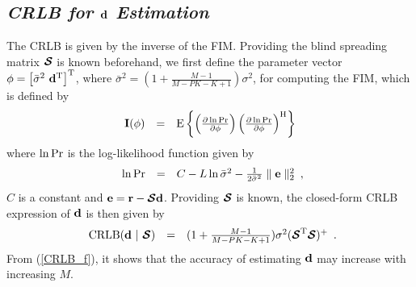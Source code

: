 \documentclass[a4paper,10pt,fleqn, twocolumn]{IEEETran}
\newcommand{\br}{{\mathbf r}}
\newcommand{\bd}{{\bf d}}
\newcommand{\bbf}{{\bf d}}
\newcommand{\bI}{{\bf I}}
\newcommand{\bcS}{{\mbox {\boldmath ${\cal S}$}}}
\begin{document}
\subsection{\em CRLB for $\bd$ Estimation}
The CRLB is given by the inverse of the FIM. Providing the blind
spreading matrix $\bcS$ is known beforehand, we first define the
parameter vector $\mathbf{\phi} = \left[\bar{\sigma}^{2}\
\bbf^{\rm T}\right]^{\rm T}$, where $\bar{\sigma}^{2}
=(1+\frac{M-1}{M-PK-K+1})\sigma^{2}$, for computing the FIM, which
is defined by
\begin{equation}
\begin{array}{rcl}
\bI(\mathbf{\phi}) &=& {\rm E} \left\{ \left( \frac{\partial
\ln{\rm Pr}}{\partial \mathbf{\phi}} \right) \left( \frac{\partial
\ln{\rm Pr}}{\partial \mathbf{\phi}} \right)^{\rm H} \right\}
\label{fim}
\end{array}
\end{equation}
\noindent where $\ln{\rm Pr}$ is the log-likelihood function given
by
\begin{equation}
\begin{array}{rcl}
\ln{\rm
Pr}&=&C-L\ln\bar{\sigma}^2-\frac{1}{2\bar{\sigma}^2}\parallel\mathbf{e}\parallel_2^2
\end{array},\label{logl}
\end{equation}
\noindent $C$ is a constant and $\mathbf{e}=\br-\bcS\bbf$.
Providing $\bcS$ is known, the closed-form CRLB expression of
$\bbf$ is then given by
\begin{equation}
\begin{array}{rcl}
{\rm CRLB}(\bbf\ |\ \bcS) &
=&(1+\frac{M-1}{M-PK-K+1})\sigma^{2}(\bcS^{\rm T}\bcS)^{\rm +}
\end{array}.\label{CRLB_f}
\end{equation}
\noindent From (\ref{CRLB_f}), it shows that the accuracy of
estimating $\bbf$ may increase with increasing $M$.
\end{document}
